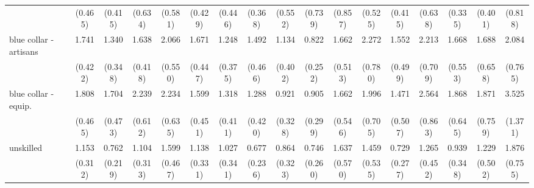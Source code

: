 {\begin{tabular}{l*{16}{c}}
                    &     (0.465)         &     (0.415)         &     (0.634)         &     (0.581)         &     (0.429)         &     (0.446)         &     (0.368)         &     (0.552)         &     (0.739)         &     (0.857)         &     (0.525)         &     (0.415)         &     (0.638)         &     (0.335)         &     (0.401)         &     (0.818)         \\
[1em]
blue collar - artisans&       1.741\sym{*}  &       1.340         &       1.638         &       2.066\sym{**} &       1.671         &       1.248         &       1.492         &       1.134         &       0.822         &       1.662         &       2.272\sym{*}  &       1.552         &       2.213\sym{*}  &       1.668         &       1.688         &       2.084\sym{*}  \\
                    &     (0.422)         &     (0.348)         &     (0.418)         &     (0.550)         &     (0.447)         &     (0.375)         &     (0.466)         &     (0.402)         &     (0.252)         &     (0.513)         &     (0.780)         &     (0.499)         &     (0.709)         &     (0.553)         &     (0.658)         &     (0.765)         \\
[1em]
blue collar - equip.&       1.808\sym{*}  &       1.704         &       2.239\sym{**} &       2.234\sym{**} &       1.599         &       1.318         &       1.288         &       0.921         &       0.905         &       1.662         &       1.996         &       1.471         &       2.564\sym{**} &       1.868         &       1.871         &       3.525\sym{**} \\
                    &     (0.465)         &     (0.473)         &     (0.612)         &     (0.635)         &     (0.451)         &     (0.411)         &     (0.420)         &     (0.328)         &     (0.299)         &     (0.546)         &     (0.705)         &     (0.507)         &     (0.863)         &     (0.645)         &     (0.759)         &     (1.371)         \\
[1em]
unskilled           &       1.153         &       0.762         &       1.104         &       1.599         &       1.138         &       1.027         &       0.677         &       0.864         &       0.746         &       1.637         &       1.459         &       0.729         &       1.265         &       0.939         &       1.229         &       1.876         \\
                    &     (0.312)         &     (0.219)         &     (0.313)         &     (0.467)         &     (0.331)         &     (0.341)         &     (0.236)         &     (0.323)         &     (0.260)         &     (0.570)         &     (0.535)         &     (0.277)         &     (0.452)         &     (0.348)         &     (0.502)         &     (0.755)         \\

\end{tabular}}
